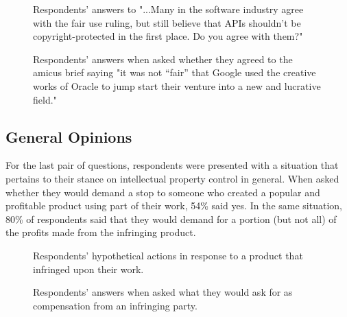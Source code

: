 \documentclass[prodmode,cs196]{acmlarge}
\begin{document}
\begin{figure}[h]
	\caption{Respondents' answers to "...Many in the software industry agree with the fair use ruling, but still believe that APIs shouldn’t be copyright-protected in the first place. Do you agree with them?"}
\end{figure}

\begin{figure}[H]
	\caption{Respondents' answers when asked whether they agreed to the amicus brief saying "it was not “fair” that Google used the creative works of Oracle to jump start their venture into a new and lucrative field."}
\end{figure}

\subsection{General Opinions}

For the last pair of questions, respondents were presented with a situation that pertains to their stance on intellectual property control in general. When asked whether they would demand a stop to someone who created a popular and profitable product using part of their work, 54\% said yes. In the same situation, 80\% of respondents said that they would demand for a portion (but not all) of the profits made from the infringing product.

\begin{figure}[h]
	\caption{Respondents' hypothetical actions in response to a product that infringed upon their work.}
\end{figure}

\begin{figure}[H]
	\caption{Respondents' answers when asked what they would ask for as compensation from an infringing party.}
\end{figure}
\end{document}
